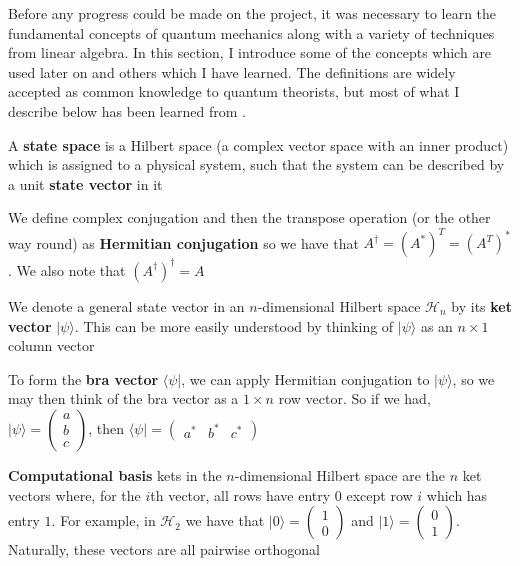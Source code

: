\documentclass[12pt,a4paper]{article}
\numberwithin{equation}{section}
\begin{document}
Before any progress could be made on the project, it was necessary to learn the fundamental concepts of quantum mechanics along with a variety of techniques from linear algebra. In this section, I introduce some of the concepts which are used later on and others which I have learned. The definitions are widely accepted as common knowledge to quantum theorists, but most of what I describe below has been learned from \cite{NielsenChuang}.

\vskip 5mm

A {\bf state space} is a Hilbert space (a complex vector space with an inner product) which is assigned to a physical system, such that the system can be described by a unit {\bf state vector} in it

\vskip 2mm

We define complex conjugation and then the transpose operation (or the other way round) as {\bf Hermitian conjugation} so we have that $A^\dagger = (A^*)^T = (A^T)^*$. We also note that $(A^\dagger)^\dagger = A$

\vskip 2mm

We denote a general state vector in an $n$-dimensional Hilbert space $\mathcal{H}_n$ by its {\bf ket vector} $|\psi\rangle$. This can be more easily understood by thinking of $|\psi\rangle$ as an $n \times 1$ column vector

\vskip 2mm

To form the {\bf bra vector} $\langle\psi|$, we can apply Hermitian conjugation to $|\psi\rangle$, so we may then think of the bra vector as a $1 \times n$ row vector. So if we had, $|\psi\rangle = \begin{pmatrix} a \\ b \\c \end{pmatrix}$, then $\langle\psi| = \begin{pmatrix} a^* & b^* & c^* \end{pmatrix}$

\vskip 2mm

{\bf Computational basis} kets in the $n$-dimensional Hilbert space are the $n$ ket vectors where, for the $i$th vector, all rows have entry $0$ except row $i$ which has entry $1$. For example, in $\mathcal{H}_2$ we have that $|0\rangle = \begin{pmatrix} 1 \\ 0 \end{pmatrix}$ and $|1\rangle = \begin{pmatrix} 0 \\ 1 \end{pmatrix}$. Naturally, these vectors are all pairwise orthogonal
\end{document}
